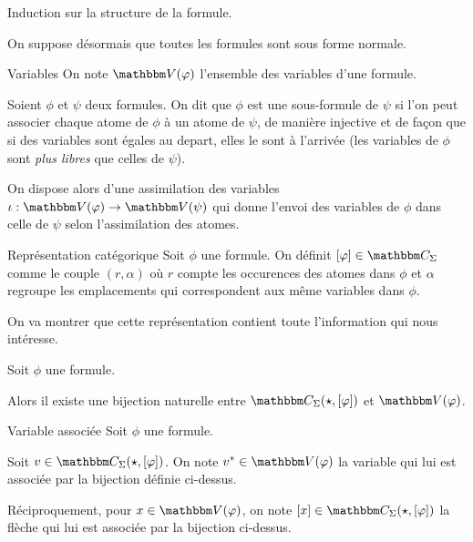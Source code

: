 \begin{pv} Induction sur la structure de la formule.
\end{pv}

On suppose désormais que toutes les formules sont sous forme normale.

\begin{defi}{Variables}
    On note $\V(\phi)$ l'ensemble des variables d'une formule.
\end{defi}

\begin{rem}
    Soient $\phi$ et $\psi$ deux formules. On dit que $\phi$ est une sous-formule
    de $\psi$ si l'on peut associer chaque atome de $\phi$ à un atome de $\psi$, de
    manière injective et de façon que si des variables sont égales au depart, elles
    le sont à l'arrivée (les variables de $\phi$ sont \emph{plus libres} que celles
    de $\psi$).

    On dispose alors d'une assimilation des variables
    $\iota : \V(\phi)\rightarrow \V(\psi)$ qui donne l'envoi des variables de $\phi$
    dans celle de $\psi$ selon l'assimilation des atomes.
\end{rem}

\begin{defi}{Représentation catégorique}
    Soit $\phi$ une formule. On définit $[\phi]\in\C_\Sigma$ comme le couple $(r,\alpha)$
    où $r$ compte les occurences des atomes dans $\phi$ et $\alpha$ regroupe les
    emplacements qui correspondent aux même variables dans $\phi$.
\end{defi}

On va montrer que cette représentation contient toute l'information qui nous intéresse.

\begin{lem}
    Soit $\phi$ une formule.

    Alors il existe une bijection naturelle entre $\C_\Sigma(\star, [\phi])$ et
    $\V(\phi)$.
\end{lem}

\begin{defi}{Variable associée}
    Soit $\phi$ une formule.

    Soit $v\in\C_\Sigma(\star, [\phi])$. On note $v^*\in\V(\phi)$ la variable qui
    lui est associée par la bijection définie ci-dessus.

    Réciproquement, pour $x\in\V(\phi)$, on note $[x]\in\C_\Sigma(\star, [\phi])$
    la flèche qui lui est associée par la bijection ci-dessus.
\end{defi}

